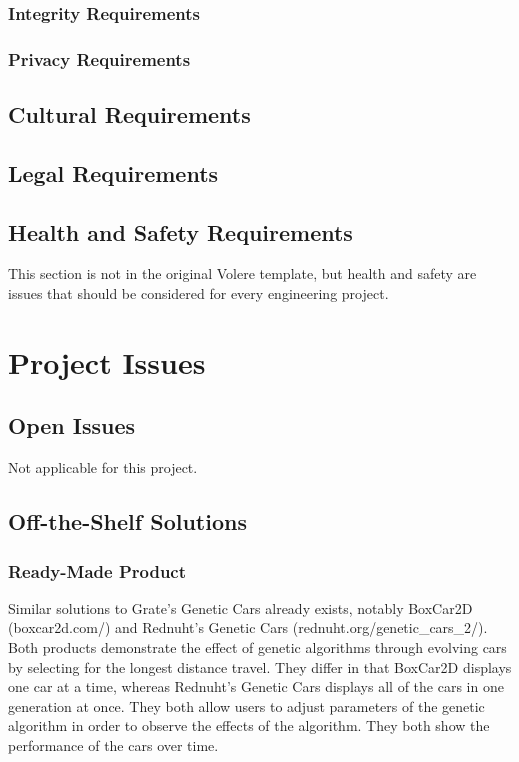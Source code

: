 \documentclass[12pt, titlepage]{article}
\begin{document}
\subsubsection{Integrity Requirements}

\subsubsection{Privacy Requirements}

\subsection{Cultural Requirements}

\subsection{Legal Requirements}

\subsection{Health and Safety Requirements}

This section is not in the original Volere template, but health and safety are
issues that should be considered for every engineering project.

\section{Project Issues}

\subsection{Open Issues}
Not applicable for this project.

\subsection{Off-the-Shelf Solutions}

\subsubsection{Ready-Made Product}
Similar solutions to Grate's Genetic Cars already exists, notably BoxCar2D 
(boxcar2d.com/) and Rednuht's Genetic Cars (rednuht.org/genetic\_cars\_2/). Both 
products demonstrate the effect of genetic algorithms through evolving cars by 
selecting for the longest distance travel. They differ in that BoxCar2D displays 
one car at a time, whereas Rednuht's Genetic Cars displays all of the cars in 
one generation at once. They both allow users to adjust parameters of the 
genetic algorithm in order to observe the effects of the algorithm. They both 
show the performance of the cars over time.
\end{document}
